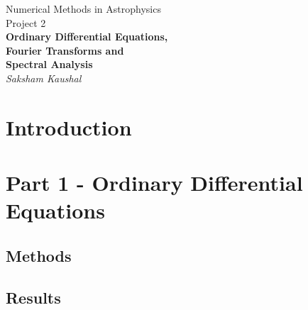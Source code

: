 \documentclass[a4paper]{article}
\begin{document}
	
	
	\begin{titlepage}
		\begin{center}
			\Large Numerical Methods in Astrophysics \\
			\vspace{1cm}
			\huge{
				Project 2 \\
				\vspace{0.5cm}
				\textbf{Ordinary Differential Equations,}\\
				\textbf{Fourier Transforms and} \\
				\textbf{Spectral Analysis} \\
				\vspace{1cm}
			}
			\Large \emph{Saksham Kaushal}
		\end{center}
	\end{titlepage}
	
	
	\tableofcontents
	\newpage
	
	
	\section{Introduction} \label{Introduction}
	
	
	\section{Part 1 - Ordinary Differential Equations} \label{task1}
	
		
		\subsection{Methods} \label{methods1}
		
		
		\subsection{Results} \label{results1}
		
\end{document}
